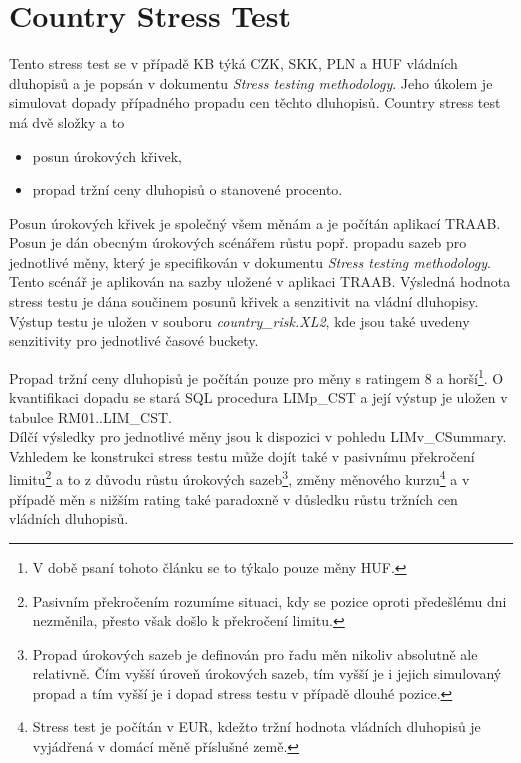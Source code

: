 \documentclass[a4paper]{book}
\begin{document}
\chapter{Country Stress Test}

Tento stress test se v případě KB týká CZK, SKK, PLN a HUF vládních dluhopisů a je popsán v dokumentu \textit{Stress testing methodology}. Jeho úkolem je simulovat dopady případného propadu cen těchto dluhopisů. Country stress test má dvě složky a to
\begin{itemize}
\item posun úrokových křivek,
\item propad tržní ceny dluhopisů o stanovené procento.
\end{itemize}

Posun úrokových křivek je společný všem měnám a je počítán aplikací TRAAB. Posun je dán obecným úrokových scénářem růstu popř. propadu sazeb pro jednotlivé měny, který je specifikován v dokumentu \textit{Stress testing methodology}. Tento scénář je aplikován na sazby uložené v aplikaci TRAAB. Výsledná hodnota stress testu je dána součinem posunů křivek a senzitivit na vládní dluhopisy. Výstup testu je uložen v souboru \textit{country\_risk.XL2}, kde jsou také uvedeny senzitivity pro jednotlivé časové buckety.

Propad tržní ceny dluhopisů je počítán pouze pro měny s ratingem 8 a horší\footnote{V době psaní tohoto článku se to týkalo pouze měny HUF.}. O kvantifikaci dopadu se stará SQL procedura LIMp\_CST a její výstup je uložen v tabulce RM01..LIM\_CST.\\

Dílčí výsledky pro jednotlivé měny jsou k dispozici v pohledu LIMv\_CSummary. Vzhledem ke konstrukci stress testu může dojít také v pasivnímu překročení limitu\footnote{Pasivním překročením rozumíme situaci, kdy se pozice oproti předešlému dni nezměnila, přesto však došlo k překročení limitu.} a to z důvodu růstu úrokových sazeb\footnote{Propad úrokových sazeb je definován pro řadu měn nikoliv absolutně ale relativně. Čím vyšší úroveň úrokových sazeb, tím vyšší je i jejich simulovaný propad a tím vyšší je i dopad stress testu v případě dlouhé pozice.}, změny měnového kurzu\footnote{Stress test je počítán v EUR, kdežto tržní hodnota vládních dluhopisů je vyjádřená v domácí měně příslušné země.} a v případě měn s nižším rating také paradoxně v důsledku růstu tržních cen vládních dluhopisů. 
\end{document}

